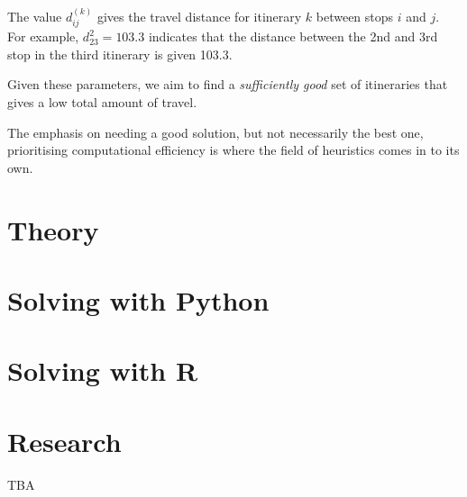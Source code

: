 The value \(d^{(k)}_{ij}\) gives the travel distance for itinerary \(k\) between
stops \(i\) and \(j\). For example, \(d^{2}_{23}=103.3\) %
indicates that the distance between the 2nd and 3rd stop in the third itinerary
is given 103.3. %

Given these parameters, we aim to find a \emph{sufficiently good} set of
itineraries that gives a low total amount of travel.

The emphasis on needing a good solution, but not necessarily the best one,
prioritising computational efficiency is where the field of heuristics comes in
to its own.

\section{Theory}\label{sec:theory}

\section{Solving with Python}\label{sec:solving-with-python}

\section{Solving with R}\label{sec:solving-with-R}

\section{Research}\label{sec:research}

TBA
